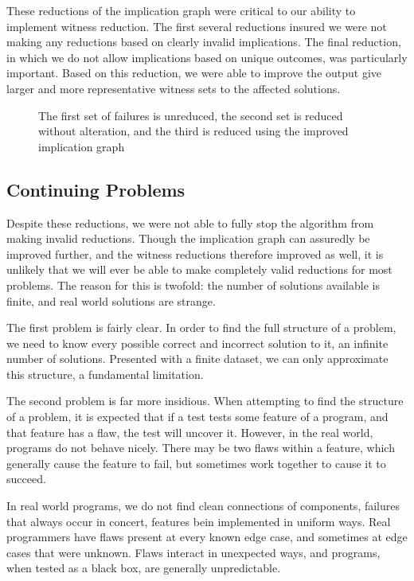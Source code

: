 \documentclass[11pt,twoside]{article}
\begin{document}
These reductions of the implication graph were critical to our ability to implement witness reduction. The first several reductions insured we were not making any reductions based on clearly invalid implications. The final reduction, in which we do not allow implications based on unique outcomes, was particularly important. Based on this reduction, we were able to improve the output give larger and more representative witness sets to the affected solutions.

\begin{figure}



\caption{The first set of failures is unreduced, the second set is reduced without alteration, and the third is reduced using the improved implication graph}
\end{figure}

\subsection{Continuing Problems}

Despite these reductions, we were not able to fully stop the algorithm from making invalid reductions. Though the implication graph can assuredly be improved further, and the witness reductions therefore improved as well, it is unlikely that we will ever be able to make completely valid reductions for most problems. The reason for this is twofold: the number of solutions available is finite, and  real world solutions are strange.

The first problem is fairly clear. In order to find the full structure of a problem, we need to know every possible correct and incorrect solution to it, an infinite  number of solutions. Presented with a finite dataset, we can only approximate this structure, a fundamental limitation.

The second problem is far more insidious. When attempting to find the structure of a problem, it is expected that if a test tests some feature of a program, and that feature has a flaw, the test will uncover it. However, in the real world, programs do not behave nicely. There may be two flaws within a feature, which generally cause the feature to fail, but sometimes work together to cause it to succeed.

In real world programs, we do not find clean connections of components, failures that always occur in concert, features bein implemented in uniform ways. Real programmers have flaws present at every known edge case, and sometimes at edge cases that were unknown. Flaws interact in unexpected ways, and programs, when tested as a black box, are generally unpredictable.
\end{document}
